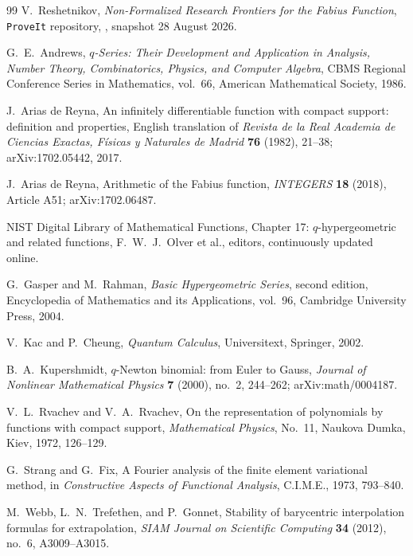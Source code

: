 \begin{thebibliography}{99}
V.~Reshetnikov,
\newblock \emph{Non-Formalized Research Frontiers for the Fabius
Function},
\newblock \texttt{ProveIt} repository, \repo, snapshot 28 August
2026.

G.~E.~Andrews,
\newblock \emph{$q$-Series: Their Development and Application in Analysis,
Number Theory, Combinatorics, Physics, and Computer Algebra},
\newblock CBMS Regional Conference Series in Mathematics, vol.~66,
American Mathematical Society, 1986.

J.~Arias de Reyna,
\newblock An infinitely differentiable function with compact support:
definition and properties,
\newblock English translation of \emph{Revista de la Real Academia de
Ciencias Exactas, F\'isicas y Naturales de Madrid} \textbf{76} (1982),
21--38; arXiv:1702.05442, 2017.

J.~Arias de Reyna,
\newblock Arithmetic of the Fabius function,
\newblock \emph{INTEGERS} \textbf{18} (2018), Article A51;
arXiv:1702.06487.

NIST Digital Library of Mathematical Functions,
\newblock Chapter 17: $q$-hypergeometric and related functions,
\newblock F.~W.~J.~Olver et al., editors, continuously updated online.

G.~Gasper and M.~Rahman,
\newblock \emph{Basic Hypergeometric Series}, second edition,
\newblock Encyclopedia of Mathematics and its Applications, vol.~96,
Cambridge University Press, 2004.

V.~Kac and P.~Cheung,
\newblock \emph{Quantum Calculus},
\newblock Universitext, Springer, 2002.

B.~A.~Kupershmidt,
\newblock $q$-Newton binomial: from Euler to Gauss,
\newblock \emph{Journal of Nonlinear Mathematical Physics} \textbf{7}
(2000), no.~2, 244--262; arXiv:math/0004187.

V.~L.~Rvachev and V.~A.~Rvachev,
\newblock On the representation of polynomials by functions with compact
support,
\newblock \emph{Mathematical Physics}, No.~11, Naukova Dumka, Kiev, 1972,
126--129.

G.~Strang and G.~Fix,
\newblock A Fourier analysis of the finite element variational method,
\newblock in \emph{Constructive Aspects of Functional Analysis}, C.I.M.E.,
1973, 793--840.

M.~Webb, L.~N.~Trefethen, and P.~Gonnet,
\newblock Stability of barycentric interpolation formulas for extrapolation,
\newblock \emph{SIAM Journal on Scientific Computing} \textbf{34} (2012),
no.~6, A3009--A3015.


\end{thebibliography}
